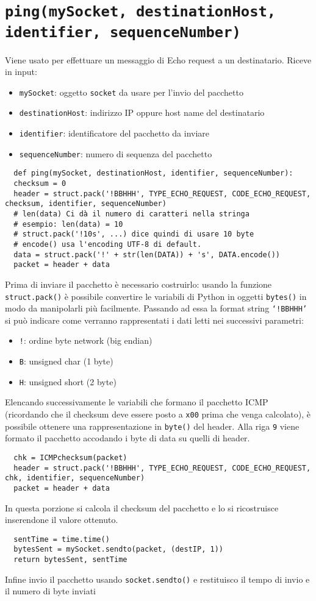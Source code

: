 \documentclass[a4paper,12pt]{report}
\begin{document}
\section{\texttt{ping(mySocket, destinationHost, identifier, sequenceNumber)}}
Viene usato per effettuare un messaggio di Echo request a un destinatario.
Riceve in input:
\begin{itemize} 
  \item \texttt{mySocket}: oggetto \texttt{socket} da usare per l'invio del pacchetto
  \item \texttt{destinationHost}: indirizzo IP oppure host name del destinatario
  \item \texttt{identifier}: identificatore del pacchetto da inviare
  \item \texttt{sequenceNumber}: numero di sequenza del pacchetto
\end{itemize}
\begin{verbatim}
  def ping(mySocket, destinationHost, identifier, sequenceNumber):
  checksum = 0
  header = struct.pack('!BBHHH', TYPE_ECHO_REQUEST, CODE_ECHO_REQUEST, checksum, identifier, sequenceNumber)
  # len(data) Ci dà il numero di caratteri nella stringa
  # esempio: len(data) = 10
  # struct.pack('!10s', ...) dice quindi di usare 10 byte
  # encode() usa l'encoding UTF-8 di default. 
  data = struct.pack('!' + str(len(DATA)) + 's', DATA.encode())
  packet = header + data
\end{verbatim}
Prima di inviare il pacchetto è necessario costruirlo: usando la funzione \texttt{struct.pack()} è possibile convertire le variabili di Python in oggetti \texttt{bytes()} in modo da manipolarli più facilmente.
%
Passando ad essa la format string \texttt{`!BBHHH'} si può indicare come verranno rappresentati i dati letti nei successivi parametri:
\begin{itemize}
  \item \texttt{!}: ordine byte network (big endian)
  \item \texttt{B}: unsigned char (1 byte)
  \item \texttt{H}: unsigned short (2 byte)
\end{itemize}
Elencando successivamente le variabili che formano il pacchetto ICMP (ricordando che il checksum deve essere posto a \texttt{x00} prima che venga calcolato), è possibile ottenere una rappresentazione in \texttt{byte()} del header.
%
Alla riga \texttt{9} viene formato il pacchetto accodando i byte di data su quelli di header.
\begin{verbatim}
  chk = ICMPchecksum(packet)
  header = struct.pack('!BBHHH', TYPE_ECHO_REQUEST, CODE_ECHO_REQUEST, chk, identifier, sequenceNumber)
  packet = header + data
\end{verbatim}
In questa porzione si calcola il checksum del pacchetto e lo si ricostruisce inserendone il valore ottenuto.
\begin{verbatim}
  sentTime = time.time()
  bytesSent = mySocket.sendto(packet, (destIP, 1))
  return bytesSent, sentTime
\end{verbatim}
Infine invio il pacchetto usando \texttt{socket.sendto()} e restituisco il tempo di invio e il numero di byte inviati
\end{document}
